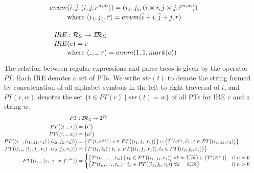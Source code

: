 \documentclass[AMA,STIX1COL]{WileyNJD-v2}
\newcommand{\Xund}{\rule{.4em}{.4pt}}
\newcommand{\XI}{\mathcal{I}}
\newcommand{\XIR}{\XI\!\XR}
\newcommand{\XR}{\mathcal{R}}
\newcommand{\XT}{\mathcal{T}}
\newcommand{\PT}{PT}
\newcommand{\IRE}{I\!RE}
\begin{document}
\begin{align*}
\begin{aligned}
        \\[-0.2em]
        enum &(\bar{i}, \bar{j}, (i, j, r^{n,m})) = (i_1, j_1, (\bar{i} \times i, \bar{j} \times j, \bar{r}^{n,m})) \\[-0.2em]
            &\text{where }
                (i_1, j_1, \bar{r}) = enum(\bar{i} + i, \bar{j} + j, r)
        \\[-0.2em]
        \\[-0.2em]
        \IRE &: \XR_\Sigma \rightarrow \XIR_\Sigma \\[-0.2em]
        \IRE&(e) = r \\[-0.2em]
            &\text{where }(\Xund, \Xund, r) = enum(1, 1, mark(e))
        \\[-0.2em]
    \end{aligned}
    \end{align*}

The relation between regular expressions and parse trees is given by the operator $\PT$.
Each IRE denotes a set of PTs.
%
We write $str(t)$ to denote the string formed by concatenation of all alphabet symbols in the left-to-right traversal of $t$,
and $\PT(r, w)$ denotes the set $\big\{ t \in \PT(r) \mid str(t) = w \big\}$ of all PTs for IRE $r$ and a string $w$.
%
    \begin{align*}
        \PT &: \XIR_\Sigma \rightarrow 2^{\XT_\Sigma}
        \\
        \PT\big((i, \Xund, \epsilon)\big) &= \{ {\epsilon}^{i} \}
        \\[-0.2em]
        \PT\big((i, \Xund, \alpha)\big) &= \{ {\alpha}^{i} \}
        \\[-0.2em]
        \PT\big((i, \Xund, (i_1, j_1, r_1) \mid (i_2, j_2, r_2))\big) &=
            \big\{ {T}^{i}(t, \varnothing^{i_2}) \mid t \in \PT\big((i_1, j_1, r_1)\big) \big\} \cup
            \big\{ {T}^{i}(\varnothing^{i_1}, t) \mid t \in \PT\big((i_2, j_2, r_2)\big) \big\}
        \\[-0.2em]
        \PT\big((i, \Xund, (i_1, j_1, r_1) \cdot (i_2, j_2, r_2))\big) &=
            \big\{ {T}^{i}(t_1, t_2) \mid
                t_1 \in \PT\big((i_1, j_1, r_1)\big),
                t_2 \in \PT\big((i_2, j_2, r_2)\big)
            \big\} \\[-0.2em]
        \PT\big((i, \Xund, (i_1, j_1, r_1)^{n, m})\big) &=
            \begin{cases}
                \big\{ {T}^{i}(t_1, \dots, t_m) \mid t_k \in \PT\big((i_1, j_1, r_1)\big) \;
                    \forall k = \overline{1, m} \big\} \cup \{ {T}^{i}(\varnothing^{i_1}) \} &\text{if } n = 0 \\[-0.2em]
                \big\{ {T}^{i}(t_n, \dots, t_m) \mid t_k \in \PT\big((i_1, j_1, r_1)\big) \;
                    \forall k = \overline{n, m} \big\} &\text{if } n > 0
            \end{cases}
    \end{align*}
    \medskip
\end{document}
